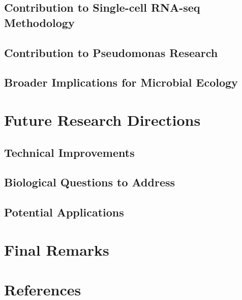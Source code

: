 \documentclass[
  11pt,
  a4paper,
]{report}
\begin{document}
\subsection{Contribution to Single-cell RNA-seq
Methodology}\label{contribution-to-single-cell-rna-seq-methodology}

\subsection{Contribution to Pseudomonas
Research}\label{contribution-to-pseudomonas-research}

\subsection{Broader Implications for Microbial
Ecology}\label{broader-implications-for-microbial-ecology}

\section{Future Research Directions}\label{future-research-directions-1}

\subsection{Technical Improvements}\label{technical-improvements-1}

\subsection{Biological Questions to
Address}\label{biological-questions-to-address}

\subsection{Potential Applications}\label{potential-applications-1}

\section{Final Remarks}\label{final-remarks}

\section{References}\label{references}

\clearpage
\captionsetup[figure]{list=false}
\captionsetup[table]{list=false}
\end{document}

